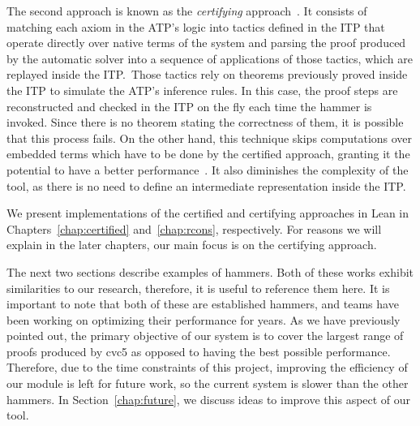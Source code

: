 The second approach is known as the \textit{certifying} approach~\cite{snipe}. It consists of matching
each axiom in the ATP's logic into tactics
defined in the ITP that operate directly over native terms of the system and parsing
the proof produced by the automatic solver into a sequence of applications
of those tactics, which are replayed inside the ITP.\
Those tactics rely on theorems previously proved inside the ITP to simulate the ATP's inference rules.
In this case, the proof steps are reconstructed and checked in the ITP on the
fly each time the hammer is invoked. Since there is no theorem stating the
correctness of them, it is possible that this process fails.
On the other hand,
this technique skips computations over embedded terms which have to be done by the
certified approach, granting it the potential to have a better
performance~\cite{ringLean}. It also diminishes the complexity of the tool, as there is no need to
define an intermediate representation inside the ITP.\

We present implementations of the certified and certifying approaches in Lean
in Chapters~\ref{chap:certified} and~\ref{chap:rcons}, respectively. For reasons
we will explain in the later chapters, our main focus is on the certifying approach.

The next two sections describe examples of hammers.
Both of these works exhibit similarities to our research, therefore, it is useful to reference them here.
It is important to note that both of these are established hammers, and teams have been working on optimizing their
performance for years. As we have previously pointed out, the primary objective of our system is to cover the largest
range of proofs produced by cvc5 as opposed to having the best possible performance.
Therefore, due to the time constraints of this project, improving the
efficiency of our module is left for future work, so the current system is slower than
the other hammers.
%
In Section~\ref{chap:future}, we discuss ideas to improve this aspect of our tool.
